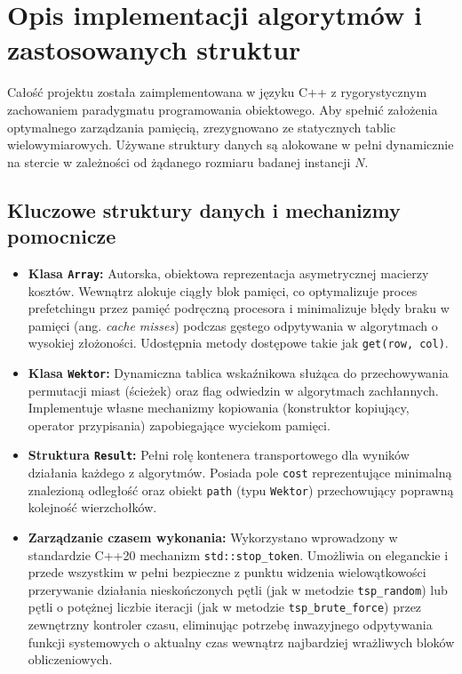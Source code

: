 \documentclass[12pt, a4paper]{article}
\begin{document}
	
	\section{Opis implementacji algorytmów i zastosowanych struktur}
	
	Całość projektu została zaimplementowana w języku C++ z rygorystycznym zachowaniem paradygmatu programowania obiektowego. Aby spełnić założenia optymalnego zarządzania pamięcią, zrezygnowano ze statycznych tablic wielowymiarowych. Używane struktury danych są alokowane w pełni dynamicznie na stercie w zależności od żądanego rozmiaru badanej instancji $N$.
	
	\subsection{Kluczowe struktury danych i mechanizmy pomocnicze}
	\begin{itemize}
		\item \textbf{Klasa \texttt{Array}:} Autorska, obiektowa reprezentacja asymetrycznej macierzy kosztów. Wewnątrz alokuje ciągły blok pamięci, co optymalizuje proces prefetchingu przez pamięć podręczną procesora i minimalizuje błędy braku w pamięci (ang. \textit{cache misses}) podczas gęstego odpytywania w algorytmach o wysokiej złożoności. Udostępnia metody dostępowe takie jak \texttt{get(row, col)}.
		\item \textbf{Klasa \texttt{Wektor}:} Dynamiczna tablica wskaźnikowa służąca do przechowywania permutacji miast (ścieżek) oraz flag odwiedzin w algorytmach zachłannych. Implementuje własne mechanizmy kopiowania (konstruktor kopiujący, operator przypisania) zapobiegające wyciekom pamięci.
		\item \textbf{Struktura \texttt{Result}:} Pełni rolę kontenera transportowego dla wyników działania każdego z algorytmów. Posiada pole \texttt{cost} reprezentujące minimalną znalezioną odległość oraz obiekt \texttt{path} (typu \texttt{Wektor}) przechowujący poprawną kolejność wierzchołków.
		\item \textbf{Zarządzanie czasem wykonania:} Wykorzystano wprowadzony w standardzie C++20 mechanizm \texttt{std::stop\_token}. Umożliwia on eleganckie i przede wszystkim w pełni bezpieczne z punktu widzenia wielowątkowości przerywanie działania nieskończonych pętli (jak w metodzie \texttt{tsp\_random}) lub pętli o potężnej liczbie iteracji (jak w metodzie \texttt{tsp\_brute\_force}) przez zewnętrzny kontroler czasu, eliminując potrzebę inwazyjnego odpytywania funkcji systemowych o aktualny czas wewnątrz najbardziej wrażliwych bloków obliczeniowych.
	\end{itemize}
	
\end{document}
